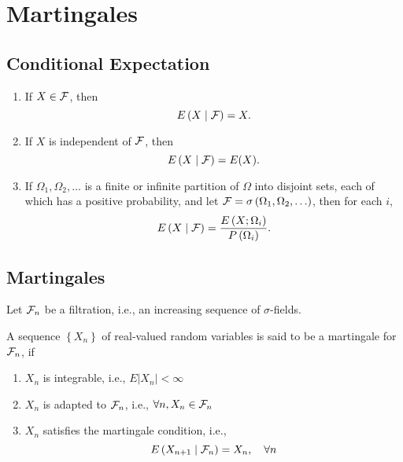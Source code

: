 \chapter{Martingales}

\section{Conditional Expectation}

\begin{definition}

\end{definition}

\begin{example}
	\begin{enumerate}
		\item If $X\in{\mathcal F}$, then
		      \begin{equation*}
			      E\left(X\mid{\mathcal F}\right)=X.
		      \end{equation*}
		\item If $X$ is independent of ${\mathcal F}$, then
		      \begin{equation*}
			      E\left(X\mid{\mathcal F}\right)=E(X).
		      \end{equation*}
		\item If $\Omega_{1}, \Omega_{2}, \ldots$ is a finite or infinite partition of $\Omega$ into disjoint sets, each of which has a positive probability, and let ${\mathcal F}=\sigma\left(\Omega_{1},\Omega_{2},\ldots\right)$, then for each $i$,
		      \begin{equation*}
			      E\left(X\mid{\mathcal F}\right)=\frac{E\left(X;\Omega_{i}\right)}{P\left(\Omega_{i}\right)}.
		      \end{equation*}
	\end{enumerate}
\end{example}

\begin{property}

\end{property}

\section{Martingales}

Let ${\mathcal F}_{n}$ be a filtration, i.e., an increasing sequence of $\sigma$-fields.
\begin{definition}[Martingale]
	A sequence $\left\{X_{n}\right\}$ of real-valued random variables  is said to be a martingale for ${\mathcal F}_{n}$, if
	\begin{enumerate}
		\item $X_{n}$ is integrable, i.e., $E\left|X_{n}\right|<\infty$
		\item $X_{n}$ is adapted to ${\mathcal F}_{n}$, i.e., $\forall n,X_{n}\in {\mathcal F}_{n}$
		\item $X_{n}$ satisfies the martingale condition, i.e.,
		      \begin{equation}
			      E\left(X_{n+1}\mid{\mathcal F}_{n}\right)=X_{n},\quad\forall n
		      \end{equation}
	\end{enumerate}
\end{definition}

